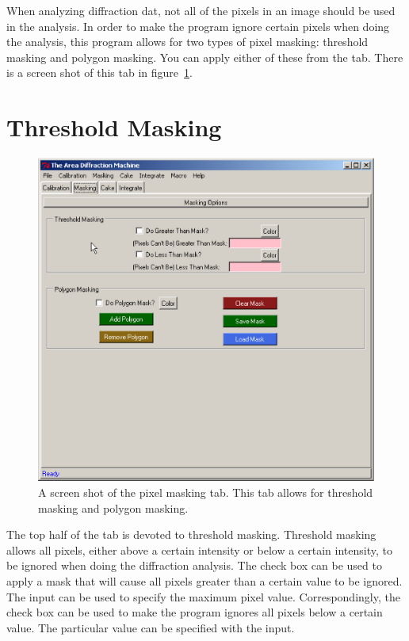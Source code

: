 When analyzing diffraction dat, not all of the pixels in 
an image should be used in the analysis. In order to make 
the program
ignore certain pixels when doing the analysis, this
program allows for two types of pixel masking:
threshold masking and polygon masking. You can 
apply either of these from the 
 tab. There is a screen
shot of this tab in figure~\ref{masking_tab}. 

\section{Threshold Masking}

\begin{figure}
    \centering
    \includegraphics[scale=.75]{figures/masking_tab.eps}
    \caption{A screen shot of the pixel masking tab. This
    tab allows for threshold masking and polygon masking.} 
    \label{masking_tab}
\end{figure}

The top half of the  tab is devoted to 
threshold masking. Threshold masking allows all pixels, 
either above a certain intensity or below a certain 
intensity, to be ignored when doing the diffraction 
analysis. The  check box can 
be used to apply a mask that will cause all pixels 
greater than a certain value to be ignored.
The  input 
can be used to specify the maximum pixel value.
Correspondingly, the  check box
can be used to make the program ignores all
pixels below a certain value. The particular value can 
be specified with the  input. 

